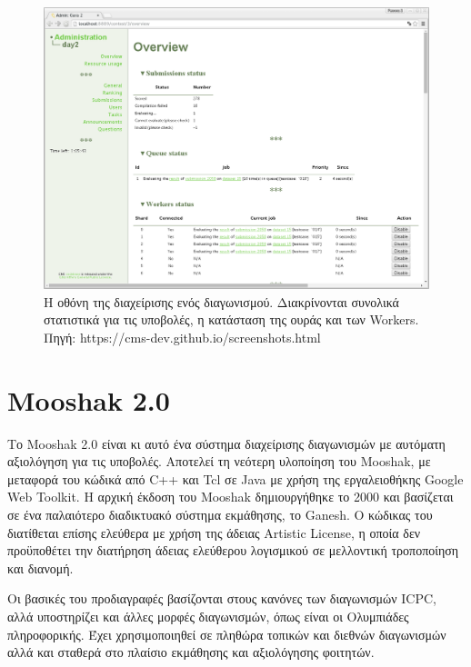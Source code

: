 \documentclass[diploma]{softlab-thesis}
\begin{document}
\begin{figure}
  \centering
  \includegraphics[scale=0.3,trim=4 4 4 4,clip]{Figures/cmsadmin.png}
  \caption[Οθόνη διαχείρισης διαγωνισμού CMS]{Η οθόνη της διαχείρισης ενός
  διαγωνισμού.  Διακρίνονται συνολικά στατιστικά για τις υποβολές, η κατάσταση
  της ουράς και των Workers. Πηγή: https://cms-dev.github.io/screenshots.html}
\end{figure}

\FloatBarrier

\section{Mooshak 2.0}

Το Mooshak 2.0 είναι κι αυτό ένα σύστημα διαχείρισης διαγωνισμών με αυτόματη
αξιολόγηση για τις υποβολές. Αποτελεί τη νεότερη υλοποίηση του Mooshak, με μεταφορά
του κώδικά από C++ και Tcl σε Java με χρήση της εργαλειοθήκης Google Web Toolkit.
H αρχική έκδοση του Mooshak δημιουργήθηκε το 2000 και βασίζεται σε ένα παλαιότερο
διαδικτυακό σύστημα εκμάθησης, το Ganesh. Ο κώδικας του διατίθεται επίσης ελεύθερα
με χρήση της άδειας Artistic License, η οποία δεν προϋποθέτει την διατήρηση
άδειας ελεύθερου λογισμικού σε μελλοντική τροποποίηση και διανομή.

\bigskip

Οι βασικές του προδιαγραφές βασίζονται στους κανόνες των διαγωνισμών ICPC, αλλά
υποστηρίζει και άλλες μορφές διαγωνισμών, όπως είναι οι Ολυμπιάδες πληροφορικής.
Έχει χρησιμοποιηθεί σε πληθώρα τοπικών και διεθνών διαγωνισμών αλλά και σταθερά
στο πλαίσιο εκμάθησης και αξιολόγησης φοιτητών.
\end{document}
